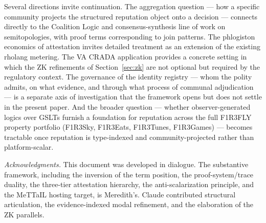 \documentclass[11pt]{article}
\theoremstyle{definition}
\theoremstyle{plain}
\theoremstyle{remark}
\begin{document}
Several directions invite continuation. The aggregation question --- how a specific community projects the structured reputation object onto a decision --- connects directly to the Coalition Logic and consensus-synthesis line of work on semitopologies, with proof terms corresponding to join patterns. The phlogiston economics of attestation invites detailed treatment as an extension of the existing rholang metering. The VA CRADA application provides a concrete setting in which the ZK refinements of Section~\ref{sec:zk} are not optional but required by the regulatory context. The governance of the identity registry --- whom the polity admits, on what evidence, and through what process of communal adjudication --- is a separate axis of investigation that the framework opens but does not settle in the present paper. And the broader question --- whether observer-generated logics over GSLTs furnish a foundation for reputation across the full F1R3FLY property portfolio (F1R3Sky, F1R3Eats, F1R3Tunes, F1R3Games) --- becomes tractable once reputation is type-indexed and community-projected rather than platform-scalar.

\bigskip

\noindent\textit{Acknowledgments.} This document was developed in dialogue. The substantive framework, including the inversion of the term position, the proof-system/trace duality, the three-tier attestation hierarchy, the anti-scalarization principle, and the MeTTaIL hosting target, is Meredith's. Claude contributed structural articulation, the evidence-indexed modal refinement, and the elaboration of the ZK parallels.
\end{document}

